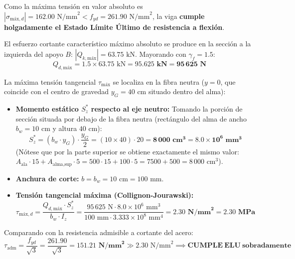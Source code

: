 {    Como la máxima tensión en valor absoluto es $|\sigma_{\text{máx},d}| = 162.00\text{ N/mm}^2 < f_{yd} = 261.90\text{ N/mm}^2$, la viga \textbf{cumple holgadamente el Estado Límite Último de resistencia a flexión}.


    El esfuerzo cortante característico máximo absoluto se produce en la sección a la izquierda del apoyo $B$: $|Q_{k,\text{máx}}| = 63.75\text{ kN}$.
    Mayorando con $\gamma_f = 1.5$:
    \begin{equation}
        Q_{d,\text{máx}} = 1.5 \times 63.75\text{ kN} = \mathbf{95.625\text{ kN} = 95\,625\text{ N}}
    \end{equation}

    La máxima tensión tangencial $\tau_{\text{máx}}$ se localiza en la fibra neutra ($y = 0$, que coincide con el centro de gravedad $y_G = 40\text{ cm}$ situado dentro del alma):
    \begin{itemize}
        \item \textbf{Momento estático $S_z^*$ respecto al eje neutro:}
              Tomando la porción de sección situada por debajo de la fibra neutra (rectángulo del alma de ancho $b_w = 10\text{ cm}$ y altura $40\text{ cm}$):
              \begin{equation}
                  S_z^* = (b_w \cdot y_G) \cdot \frac{y_G}{2} = (10 \times 40) \cdot 20 = \mathbf{8\,000\text{ cm}^3 = 8.0 \times 10^6\text{ mm}^3}
              \end{equation}
              (Nótese que por la parte superior se obtiene exactamente el mismo valor: $A_{\text{ala}} \cdot 15 + A_{\text{alma,sup}} \cdot 5 = 500 \cdot 15 + 100 \cdot 5 = 7500 + 500 = 8\,000\text{ cm}^3$).
        \item \textbf{Anchura de corte:} $b = b_w = 10\text{ cm} = 100\text{ mm}$.
        \item \textbf{Tensión tangencial máxima (Collignon-Jourawski):}
              \begin{equation}
                  \tau_{\text{máx},d} = \frac{Q_{d,\text{máx}} \cdot S_z^*}{b_w \cdot I_z} = \frac{95\,625\text{ N} \cdot 8.0 \times 10^6\text{ mm}^3}{100\text{ mm} \cdot 3.333 \times 10^8\text{ mm}^4} = \mathbf{2.30\text{ N/mm}^2 = 2.30\text{ MPa}}
              \end{equation}
    \end{itemize}
    Comparando con la resistencia admisible a cortante del acero:
    \begin{equation}
        \tau_{\text{adm}} = \frac{f_{yd}}{\sqrt{3}} = \frac{261.90}{\sqrt{3}} = \mathbf{151.21\text{ N/mm}^2} \gg 2.30\text{ N/mm}^2 \implies \mathbf{CUMPLE\ ELU\ sobradamente}
    \end{equation}

}
